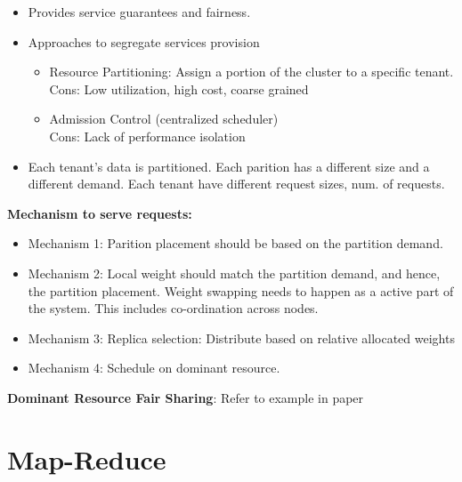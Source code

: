 \documentclass[parskip=half]{scrartcl}
\begin{document}
        \begin{itemize}
            \item 
            Provides service guarantees and fairness.
            \item 
            Approaches to segregate services provision
            \begin{itemize}
                \item 
                Resource Partitioning: Assign a portion of the cluster to a specific tenant.\\
                Cons: Low utilization, high cost, coarse grained
                \item 
                Admission Control (centralized scheduler)\\
                Cons: Lack of performance isolation
            \end{itemize}
            \item 
            Each tenant's data is partitioned. Each parition has a different size and a different demand. Each tenant have different request sizes, num. of requests.
        \end{itemize}

        \textbf{Mechanism to serve requests:}
        \begin{itemize}
            \item 
            Mechanism 1: Parition placement should be based on the partition demand.
            \item 
            Mechanism 2: Local weight should match the partition demand, and hence, the partition placement.
            Weight swapping needs to happen as a active part of the system. This includes co-ordination across nodes.
            \item 
            Mechanism 3: Replica selection: Distribute based on relative allocated weights
            \item 
            Mechanism 4: Schedule on dominant resource.
        \end{itemize}

        \textbf{Dominant Resource Fair Sharing}:
        Refer to example in paper
    



\section{Map-Reduce} %
\label{sec:map_reduce}
\end{document}
